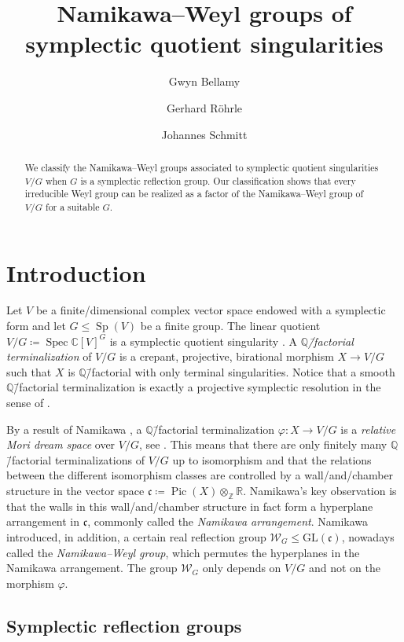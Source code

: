 \documentclass[a4paper]{amsart}
\title[Namikawa--Weyl groups of symplectic quotient singularities]{Namikawa--Weyl groups of\\ symplectic quotient singularities}
\author[G.\ Bellamy]{Gwyn Bellamy}
\author[G.\ Röhrle]{Gerhard Röhrle}
\author[J.\ Schmitt]{Johannes Schmitt}
\theoremstyle{plain}
\theoremstyle{definition}
\theoremstyle{remark}
\DeclareMathOperator{\Pic}{Pic}
\DeclareMathOperator{\Sp}{Sp}
\DeclareMathOperator{\Spec}{Spec}
\newcommand{\CC}{\mathbb C}
\newcommand{\QQ}{\mathbb Q}
\newcommand{\RR}{\mathbb R}
\newcommand{\ZZ}{\mathbb Z}
\renewcommand{\phi}{\varphi}
\begin{document}
\begin{abstract}
  We classify the Namikawa--Weyl groups associated to symplectic quotient singularities \(V/G\) when \(G\) is a symplectic reflection group.
  Our classification shows that every irreducible Weyl group can be realized as a factor of the Namikawa--Weyl group of \(V/G\) for a suitable \(G\).
\end{abstract}

\maketitle

\section{Introduction}

Let \(V\) be a finite\-/dimensional complex vector space endowed with a symplectic form and let \(G\leqslant \Sp(V)\) be a finite group. The linear quotient \(V/G \coloneqq \Spec \CC[V]^G\) is a symplectic quotient singularity \cite{Bea00}.
A \emph{\(\QQ\)\=/factorial terminalization} of \(V/G\) is a crepant, projective, birational morphism \(X \to V/G\) such that \(X\) is \(\QQ\)\=/factorial with only terminal singularities. 
Notice that a smooth \(\QQ\)\=/factorial terminalization is exactly a projective symplectic resolution in the sense of \cite{Bea00}.

By a result of Namikawa \cite{Nam15}, a \(\QQ\)\=/factorial terminalization \(\phi:X\to V/G\) is a \emph{relative Mori dream space} over \(V/G\), see \cite{HK00, Oht22}. This means that there are only finitely many \(\QQ\)\=/factorial terminalizations of \(V/G\) up to isomorphism and that the relations between the different isomorphism classes are controlled by a wall\-/and\-/chamber structure in the vector space \(\mathfrak c \coloneqq \Pic(X)\otimes_\ZZ \RR\).
Namikawa's key observation is that the walls in this wall\-/and\-/chamber structure in fact form a hyperplane arrangement in \(\mathfrak c\), commonly called the \emph{Namikawa arrangement}. Namikawa \cite{Nam10} introduced, in addition, a certain real reflection group \(\mathcal W_G \leqslant \mathrm{GL}(\mathfrak{c})\), nowadays called the \emph{Namikawa--Weyl group}, which permutes the hyperplanes in the Namikawa arrangement. The group \(\mathcal W_G\) only depends on \(V/G\) and not on the morphism \(\phi\).

\subsection*{Symplectic reflection groups}
\end{document}
